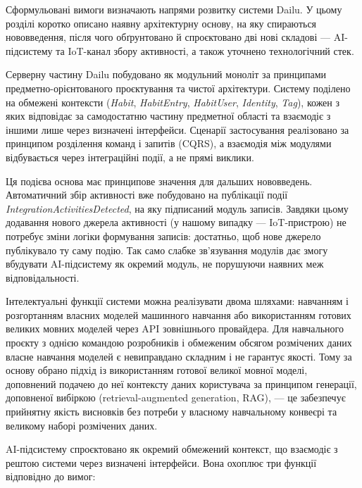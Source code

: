 
Сформульовані вимоги визначають напрями розвитку системи Dailu.
У цьому розділі коротко описано наявну архітектурну основу, на яку спираються нововведення,
після чого обґрунтовано й спроєктовано дві нові складові — AI-підсистему та IoT-канал збору
активності, а також уточнено технологічний стек.


Серверну частину Dailu побудовано як модульний моноліт за принципами
предметно-орієнтованого проєктування та чистої архітектури.
Систему поділено на обмежені контексти (\textit{Habit}, \textit{HabitEntry},
\textit{HabitUser}, \textit{Identity}, \textit{Tag}), кожен з яких відповідає за самодостатню
частину предметної області та взаємодіє з іншими лише через визначені інтерфейси.
Сценарії застосування реалізовано за принципом розділення команд і запитів (CQRS), а взаємодія
між модулями відбувається через інтеграційні події, а не прямі виклики.

Ця подієва основа має принципове значення для дальших нововведень.
Автоматичний збір активності вже побудовано на публікації події
\textit{IntegrationActivitiesDetected}, на яку підписаний модуль записів.
Завдяки цьому додавання нового джерела активності (у нашому випадку — IoT-пристрою) не потребує
зміни логіки формування записів: достатньо, щоб нове джерело публікувало ту саму подію.
Так само слабке зв'язування модулів дає змогу вбудувати AI-підсистему як окремий модуль, не
порушуючи наявних меж відповідальності.


Інтелектуальні функції системи можна реалізувати двома шляхами: навчанням і розгортанням
власних моделей машинного навчання або використанням готових великих мовних моделей через API
зовнішнього провайдера.
Для навчального проєкту з однією командою розробників і обмеженим обсягом розмічених даних
власне навчання моделей є невиправдано складним і не гарантує якості.
Тому за основу обрано підхід із використанням готової великої мовної моделі, доповнений подачею
до неї контексту даних користувача за принципом генерації, доповненої вибіркою
(retrieval-augmented generation, RAG), — це забезпечує прийнятну якість висновків без потреби у
власному навчальному конвеєрі та великому наборі розмічених даних.

AI-підсистему спроєктовано як окремий обмежений контекст, що взаємодіє з рештою системи через
визначені інтерфейси.
Вона охоплює три функції відповідно до вимог:

